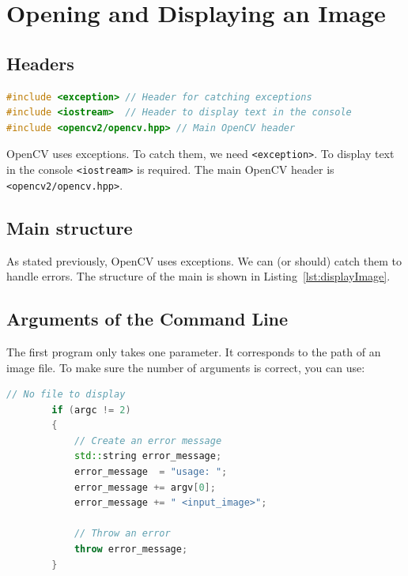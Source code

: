 \documentclass[english,a4paper,12pt,oneside]{article}
\begin{document}
\section{Opening and Displaying an Image}


\subsection{Headers}


\begin{lstlisting}[language=c++,caption=Header files.]
#include <exception> // Header for catching exceptions
#include <iostream>  // Header to display text in the console
#include <opencv2/opencv.hpp> // Main OpenCV header
\end{lstlisting}

OpenCV uses exceptions. To catch them, we need \verb+<exception>+. 
To display text in the console \verb+<iostream>+ is required. 
The main OpenCV header is \verb+<opencv2/opencv.hpp>+.


\subsection{Main structure}

As stated previously, OpenCV uses exceptions. 
We can (or should) catch them to handle errors. 
The structure of the main is shown in Listing~\ref{lst:displayImage}.




\subsection{Arguments of the Command Line}

The first program only takes one parameter. 
It corresponds to the path of an image file. To make sure the number of arguments is correct, you can use:

 \begin{lstlisting}[language=c++,caption=Checking the number of command line arguments.]
       // No file to display
        if (argc != 2)
        {
            // Create an error message
            std::string error_message;
            error_message  = "usage: ";
            error_message += argv[0];
            error_message += " <input_image>";

            // Throw an error
            throw error_message;
        }
\end{lstlisting}
\end{document}
